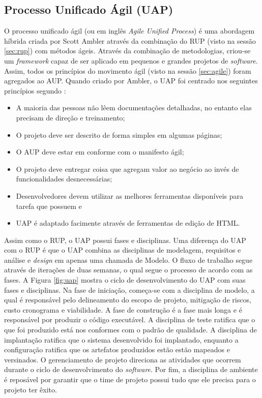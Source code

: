 \subsection{Processo Unificado Ágil (UAP)}

O processo unificado ágil (ou em inglês \textit{Agile Unified Process}) é uma abordagem híbrida criada por Scott Ambler através da combinação do RUP (visto na sessão \ref{sec:rup}) com métodos ágeis. Através da combinação de metodologias, criou-se um \textit{framework} capaz de ser aplicado em pequenos e grandes projetos de \textit{software}. Assim, todos os princípios do movimento ágil (visto na sessão \ref{sec:agile}) foram agregados ao AUP.
Quando criado por Ambler, o UAP foi centrado nos seguintes princípios segundo :

\begin{itemize}
	\item A maioria das pessoas não lêem documentações detalhadas, no entanto elas precisam de direção e treinamento;
	\item O projeto deve ser descrito de forma simples em algumas páginas;
	\item O AUP deve estar em conforme com o manifesto ágil;
	\item O projeto deve entregar coisa que agregam valor ao negócio ao invés de funcionalidades desnecessárias;
	\item Desenvolvedores devem utilizar as melhores ferramentas disponíveis para tarefa que possuem e
	\item UAP é adaptado facimente através de ferramentas de edição de HTML.
\end{itemize}

Assim como o RUP, o UAP possui fases e disciplinas. Uma diferença do UAP com o RUP é que o UAP combina as disciplinas de modelagem, requisitos e análise e \textit{design} em apenas uma chamada de Modelo. O fluxo de trabalho segue através de iterações de duas semanas, o qual segue o processo de acordo com as fases. A Figura \ref{fig:uap} mostra o ciclo de desenvolvimento do UAP com suas fases e disciplinas. Na fase de iniciação, começa-se com a disciplina de modelo, a qual é responsável pelo delineamento do escopo de projeto, mitigação de riscos, custo cronograma e viabilidade. A fase de construção é a fase mais longa e é responsável por produzir o código executável. A disciplina de teste ratifica que o que foi produzido está nos conformes com o padrão de qualidade. A disciplina de implantação ratifica que o sistema desenvolvido foi implantado, enquanto a configuração ratifica que os artefatos produzidos estão estão mapeados e versinados. O gerenciamento de projeto direciona as atividades que ocorrem durante o ciclo de desenvolvimento do \textit{software}. Por fim, a disciplina de ambiente é reposável por garantir que o time de projeto possui tudo que ele precisa para o projeto ter êxito. \cite{edeki:13}

